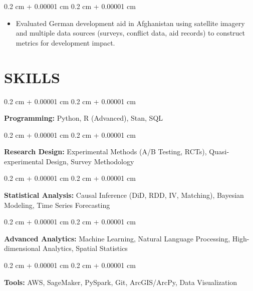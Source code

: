 \documentclass[10pt, letterpaper]{article}
\newenvironment{highlights}{
    \begin{itemize}[
        topsep=0.10 cm,
        parsep=0.10 cm,
        partopsep=0pt,
        itemsep=0pt,
        leftmargin=0.4 cm + 10pt
    ]
}{
    \end{itemize}
} %
\newenvironment{onecolentry}{
    \begin{adjustwidth}{
        0.2 cm + 0.00001 cm
    }{
        0.2 cm + 0.00001 cm
    }
}{
    \end{adjustwidth}
} %
\begin{document}
        \begin{onecolentry}
            \begin{highlights}
            \vspace{0.05 cm}
                \item Evaluated German development aid in Afghanistan using satellite imagery and multiple data sources (surveys, conflict data, aid records) to construct metrics for development impact.
            \end{highlights}
        \end{onecolentry}

    \section{SKILLS}

        \begin{onecolentry}
            \textbf{Programming:} Python, R (Advanced), Stan, SQL
        \end{onecolentry}
        \vspace{0.1 cm}
        \begin{onecolentry}
            \textbf{Research Design:} Experimental Methods (A/B Testing, RCTs), Quasi-experimental Design, Survey Methodology
        \end{onecolentry}
        \vspace{0.1 cm}
        \begin{onecolentry}
            \textbf{Statistical Analysis:} Causal Inference (DiD, RDD, IV, Matching), Bayesian Modeling, Time Series Forecasting
        \end{onecolentry}
        \vspace{0.1 cm}
        \begin{onecolentry}
            \textbf{Advanced Analytics:} Machine Learning, Natural Language Processing, High-dimensional Analytics, Spatial Statistics
        \end{onecolentry}
        \vspace{0.1 cm}
        \begin{onecolentry}
            \textbf{Tools:} AWS, SageMaker, PySpark, Git, ArcGIS/ArcPy, Data Visualization
        \end{onecolentry}

\end{document}
